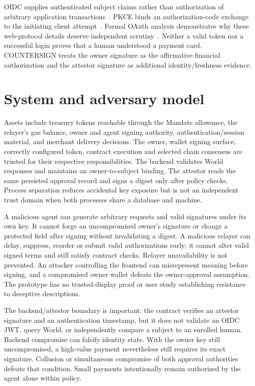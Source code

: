 \documentclass[11pt]{article}
\begin{document}
OIDC supplies authenticated subject claims rather than authorization of arbitrary application transactions~\cite{oidc}. PKCE binds an authorization-code exchange to the initiating client attempt~\cite{pkce}. Formal OAuth analysis demonstrates why these web-protocol details deserve independent scrutiny~\cite{oauthanalysis}. Neither a valid token nor a successful login proves that a human understood a payment card. COUNTERSIGN treats the owner signature as the affirmative financial authorization and the attestor signature as additional identity/freshness evidence.

\section{System and adversary model}
Assets include treasury tokens reachable through the Mandate allowance, the relayer's gas balance, owner and agent signing authority, authentication/session material, and merchant delivery decisions. The owner, wallet signing surface, correctly configured token, contract execution and selected chain consensus are trusted for their respective responsibilities. The backend validates World responses and maintains an owner-to-subject binding. The attestor reads the same persisted approval record and signs a digest only after policy checks. Process separation reduces accidental key exposure but is not an independent trust domain when both processes share a database and machine.

A malicious agent can generate arbitrary requests and valid signatures under its own key. It cannot forge an uncompromised owner's signature or change a protected field after signing without invalidating a digest. A malicious relayer can delay, suppress, reorder or submit valid authorizations early; it cannot alter valid signed terms and still satisfy contract checks. Relayer unavailability is not prevented. An attacker controlling the frontend can misrepresent meaning before signing, and a compromised owner wallet defeats the owner-approval assumption. The prototype has no trusted-display proof or user study establishing resistance to deceptive descriptions.

The backend/attestor boundary is important: the contract verifies an attestor signature and an authentication timestamp, but it does not validate an OIDC JWT, query World, or independently compare a subject to an enrolled human. Backend compromise can falsify identity state. With the owner key still uncompromised, a high-value payment nevertheless still requires its exact signature. Collusion or simultaneous compromise of both approval authorities defeats that condition. Small payments intentionally remain authorized by the agent alone within policy.
\end{document}
